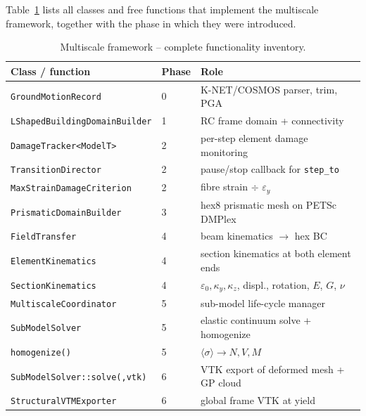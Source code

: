 Table~\ref{tab:multiscale_summary} lists all classes and free functions
that implement the multiscale framework, together with the phase in which
they were introduced.

\begin{table}[htb]
\centering
\caption{Multiscale framework -- complete functionality inventory.}
\label{tab:multiscale_summary}
\small
\begin{tabular}{lll}
\hline
Class / function & Phase & Role \\
\hline
\texttt{GroundMotionRecord}          & 0 & K-NET/COSMOS parser, trim, PGA \\
\texttt{LShapedBuildingDomainBuilder}& 1 & RC frame domain + connectivity \\
\texttt{DamageTracker<ModelT>}       & 2 & per-step element damage monitoring \\
\texttt{TransitionDirector}          & 2 & pause/stop callback for \texttt{step\_to} \\
\texttt{MaxStrainDamageCriterion}    & 2 & fibre strain $\div$ $\varepsilon_y$ \\
\texttt{PrismaticDomainBuilder}      & 3 & hex8 prismatic mesh on PETSc DMPlex \\
\texttt{FieldTransfer}               & 4 & beam kinematics $\to$ hex BC \\
\texttt{ElementKinematics}           & 4 & section kinematics at both element ends \\
\texttt{SectionKinematics}           & 4 & $\varepsilon_0, \kappa_y, \kappa_z$,
                                          displ., rotation, $E$, $G$, $\nu$ \\
\texttt{MultiscaleCoordinator}       & 5 & sub-model life-cycle manager \\
\texttt{SubModelSolver}              & 5 & elastic continuum solve + homogenize \\
\texttt{homogenize()}                & 5 & $\langle\sigma\rangle \to N,V,M$ \\
\texttt{SubModelSolver::solve(,vtk)} & 6 & VTK export of deformed mesh + GP cloud \\
\texttt{StructuralVTMExporter}       & 6 & global frame VTK at yield \\
\hline
\end{tabular}
\end{table}

